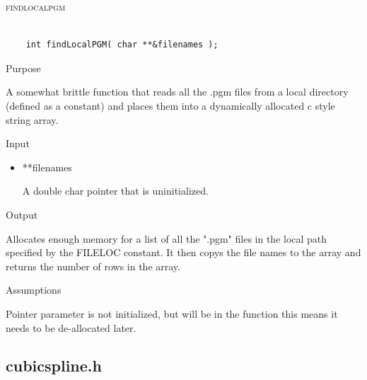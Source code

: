 \documentclass[pdftex, 11pt]{article}
\begin{document}
\begin{description}
\begin{description}
		\end{description}



	\item{\textsc{findlocalpgm}}

		\begin{lstlisting}

	int findLocalPGM( char **&filenames );
		\end{lstlisting}

		\begin{description}
			\item{Purpose}

				A somewhat brittle function that reads all the .pgm files from a local
				directory (defined as a constant) and places them into a dynamically
				allocated c style string array.

			\item{Input}

				\begin{itemize}

					\item{**filenames}
						
						A double char pointer that is uninitialized.

				\end{itemize}

			\item{Output}

				Allocates enough memory for a list of all the ".pgm" files
				in the local path specified by the FILELOC constant.  It
				then copys the file names to the array and returns the
				number of rows in the array.

			\item{Assumptions}

				Pointer parameter is not initialized, but will be in the function
				this means it needs to be de-allocated later.

		\end{description}


\end{description}

\subsection{cubicspline.h}
\end{document}
